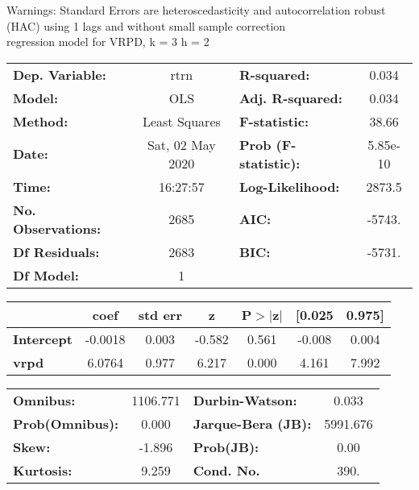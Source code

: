 Warnings: \newline
 [1] Standard Errors are heteroscedasticity and autocorrelation robust (HAC) using 1 lags and without small sample correction\\ 

regression model for VRPD, k = 3 h = 2\begin{center}
\begin{tabular}{lclc}
\toprule
\textbf{Dep. Variable:}    &       rtrn       & \textbf{  R-squared:         } &     0.034   \\
\textbf{Model:}            &       OLS        & \textbf{  Adj. R-squared:    } &     0.034   \\
\textbf{Method:}           &  Least Squares   & \textbf{  F-statistic:       } &     38.66   \\
\textbf{Date:}             & Sat, 02 May 2020 & \textbf{  Prob (F-statistic):} &  5.85e-10   \\
\textbf{Time:}             &     16:27:57     & \textbf{  Log-Likelihood:    } &    2873.5   \\
\textbf{No. Observations:} &        2685      & \textbf{  AIC:               } &    -5743.   \\
\textbf{Df Residuals:}     &        2683      & \textbf{  BIC:               } &    -5731.   \\
\textbf{Df Model:}         &           1      & \textbf{                     } &             \\
\bottomrule
\end{tabular}
\begin{tabular}{lcccccc}
                   & \textbf{coef} & \textbf{std err} & \textbf{z} & \textbf{P$> |$z$|$} & \textbf{[0.025} & \textbf{0.975]}  \\
\midrule
\textbf{Intercept} &      -0.0018  &        0.003     &    -0.582  &         0.561        &       -0.008    &        0.004     \\
\textbf{vrpd}      &       6.0764  &        0.977     &     6.217  &         0.000        &        4.161    &        7.992     \\
\bottomrule
\end{tabular}
\begin{tabular}{lclc}
\textbf{Omnibus:}       & 1106.771 & \textbf{  Durbin-Watson:     } &    0.033  \\
\textbf{Prob(Omnibus):} &   0.000  & \textbf{  Jarque-Bera (JB):  } & 5991.676  \\
\textbf{Skew:}          &  -1.896  & \textbf{  Prob(JB):          } &     0.00  \\
\textbf{Kurtosis:}      &   9.259  & \textbf{  Cond. No.          } &     390.  \\
\bottomrule
\end{tabular}
\end{center}

